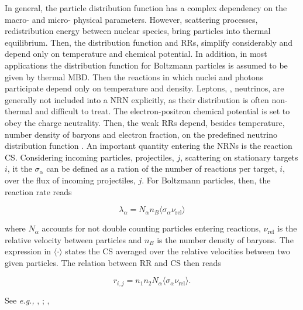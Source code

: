 In general, the particle distribution function has a complex dependency on the macro- and micro- physical parameters. However, scattering processes, redistribution energy between nuclear species, bring particles into thermal equilibrium. Then, the distribution function and \acp{RR}, simplify considerably and depend only on temperature and chemical potential. 
In addition, in most applications the distribution function for Boltzmann particles is assumed to be given by thermal \ac{MBD}. Then the reactions in which nuclei and photons participate depend only on temperature and density.
Leptons, \eg, neutrinos, are generally not included into a \ac{NRN} explicitly, as their distribution is often non-thermal and difficult to treat. The electron-positron chemical potential is set to obey the charge neutrality. Then, the weak \acp{RR} depend, besides temperature, number density of baryons and electron fraction, on the predefined neutrino distribution function . 
An important quantity entering the \acp{NRN} is the reaction \ac{CS}. Considering incoming particles, projectiles, $j$, scattering on stationary targets $i$, it the $\sigma_{\alpha}$ can be defined as a ration of the number of reactions per target, $i$, over the flux of incoming projectiles, $j$. For Boltzmann particles, then, the reaction rate reads 

\begin{equation}
\lambda_{\alpha} = N_{\alpha}n_{B}\langle\sigma_{\alpha}\nu_{\text{rel}}\rangle
\end{equation}

where $N_{\alpha}$ accounts for not double counting particles entering reactions, $\nu_{\text{rel}}$ is the relative velocity between particles and $n_B$ is the number density of baryons. The expression in $\langle\cdot\rangle$ states the \ac{CS} averaged over the relative velocities between two given particles. 
The relation between \ac{RR} and \ac{CS} then reads 

\begin{equation}
r_{i,j} = n_1 n_2 N_{\alpha} \langle\sigma_{\alpha}\nu_{\text{rel}}\rangle.
\end{equation}

See \textit{e.g.,} \cite{Clayton:1968}, ; \cite{Rolfs:1988}, 

